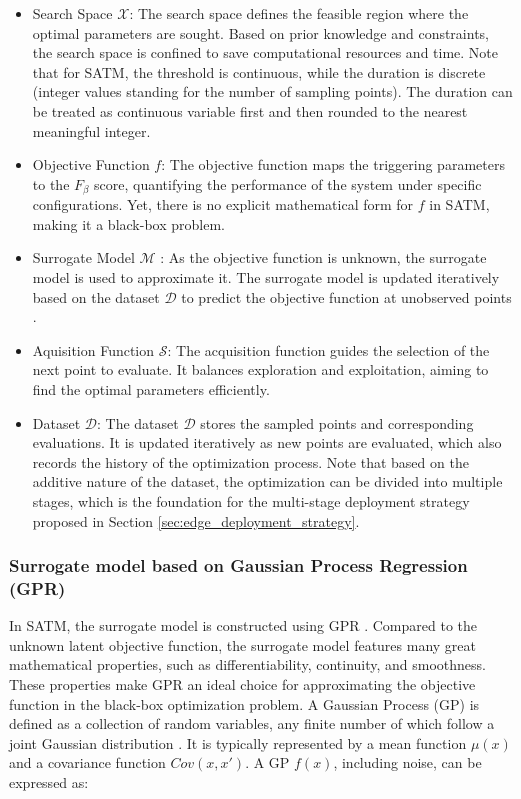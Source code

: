 \documentclass[a4paper,fleqn,numbers,sort&compress]{cas-sc}
\begin{document}
\begin{itemize}
    \item Search Space $\boldsymbol{\mathcal{X}}$: The search space defines the feasible region where the optimal parameters are sought. Based on prior knowledge and constraints, the search space is confined to save computational resources and time. Note that for SATM, the threshold is continuous, while the duration is discrete (integer values standing for the number of sampling points). The duration can be treated as continuous variable first and then rounded to the nearest meaningful integer.
    \item Objective Function $f$: The objective function maps the triggering parameters to the $F_{\beta}$ score, quantifying the performance of the system under specific configurations. Yet, there is no explicit mathematical form for $f$ in SATM, making it a black-box problem. 
    \item Surrogate Model $\boldsymbol{\mathcal{M}}$ : As the objective function is unknown, the surrogate model is used to approximate it. The surrogate model is updated iteratively based on the dataset $\boldsymbol{\mathcal{D}}$ to predict the objective function at unobserved points \citep{frazier_tutorialbayesianoptimization_2018}. 
    \item Aquisition Function $\boldsymbol{\mathcal{S}}$: The acquisition function guides the selection of the next point to evaluate. It balances exploration and exploitation, aiming to find the optimal parameters efficiently.
    \item Dataset $\boldsymbol{\mathcal{D}}$: The dataset $\boldsymbol{\mathcal{D}}$ stores the sampled points and corresponding evaluations. It is updated iteratively as new points are evaluated, which also records the history of the optimization process. Note that based on the additive nature of the dataset, the optimization can be divided into multiple stages, which is the foundation for the multi-stage deployment strategy proposed in Section \ref{sec:edge_deployment_strategy}.
\end{itemize}

\subsubsection{Surrogate model based on Gaussian Process Regression (GPR)}
In SATM, the surrogate model is constructed using GPR \citep{cui_adaptiveedgeintelligence_2025}. Compared to the unknown latent objective function, the surrogate model features many great mathematical properties, such as differentiability, continuity, and smoothness. These properties make GPR an ideal choice for approximating the objective function in the black-box optimization problem. A Gaussian Process (GP) is defined as a collection of random variables, any finite number of which follow a joint Gaussian distribution \citep{agrawal_bayesianoptimization_2021}. It is typically represented by a mean function $\mu(x)$ and a covariance function $ Cov(x,x') $. A GP $f(x)$, including noise, can be expressed as:
\end{document}
